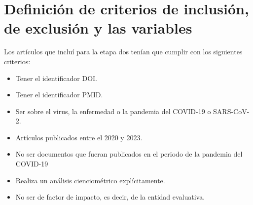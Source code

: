 \section{Definición de criterios de inclusión, de exclusión y las variables}
\noindent
Los artículos que incluí para la etapa dos tenían que cumplir con los siguientes criterios:
\begin{itemize}
    \item Tener el identificador DOI.
    \item Tener el identificador PMID.
    \item Ser sobre el virus, la enfermedad o la pandemia del COVID-19 o SARS-CoV-2.
    \item Artículos publicados entre el 2020 y 2023.
    \item No ser documentos que fueran publicados en el periodo de la pandemia del COVID-19
    \item Realiza un análisis cienciométrico explícitamente.
    \item No ser de factor de impacto, es decir, de la entidad evaluativa.
\end{itemize}
